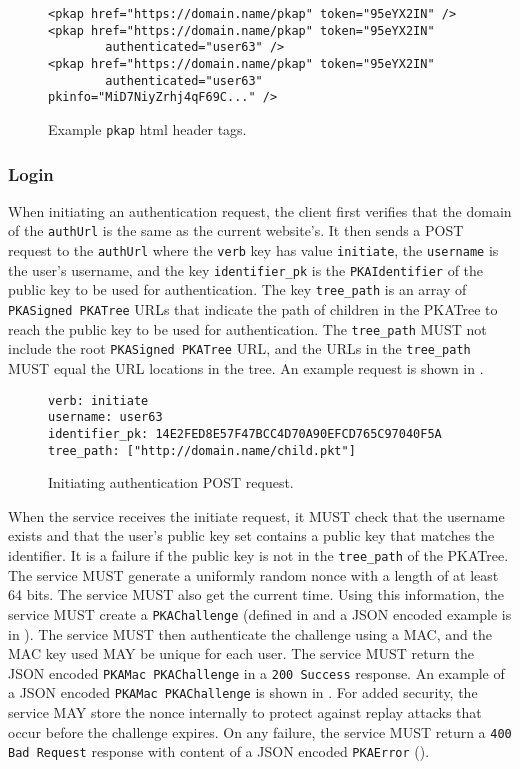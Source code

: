 \documentclass{article}
\begin{document}
\begin{figure}[h!]
\begin{lstlisting}
<pkap href="https://domain.name/pkap" token="95eYX2IN" />
<pkap href="https://domain.name/pkap" token="95eYX2IN" 
        authenticated="user63" />
<pkap href="https://domain.name/pkap" token="95eYX2IN" 
        authenticated="user63" pkinfo="MiD7NiyZrhj4qF69C..." />
\end{lstlisting}
\caption{Example \texttt{pkap} html header tags.}
\label{example:pkaptag}
\end{figure}

\subsubsection{Login}

When initiating an authentication request, the client first verifies that the domain of the \texttt{authUrl} is the same as the current website's. 
It then sends a POST request to the \texttt{authUrl} where the \texttt{verb} key has value \texttt{initiate}, the \texttt{username} is the user's username, and the key \texttt{identifier\_pk} is the \texttt{PKAIdentifier} of the public key to be used for authentication. 
The key \texttt{tree\_path} is an array of \texttt{PKASigned PKATree} URLs that indicate the path of children in the PKATree to reach the public key to be used for authentication. 
The \texttt{tree\_path} MUST not include the root \texttt{PKASigned PKATree} URL, and the URLs in the \texttt{tree\_path} MUST equal the URL locations in the tree. 
An example request is shown in . 


\begin{figure}
\begin{lstlisting}
verb: initiate
username: user63
identifier_pk: 14E2FED8E57F47BCC4D70A90EFCD765C97040F5A
tree_path: ["http://domain.name/child.pkt"]
\end{lstlisting}
\caption{Initiating authentication POST request.}
\label{fig:init_req}
\end{figure}

When the service receives the initiate request, it MUST check that the username exists and that the user's public key set contains a public key that matches the identifier. 
It is a failure if the public key is not in the \texttt{tree\_path} of the PKATree. 
The service MUST generate a uniformly random nonce with a length of at least 64 bits. 
The service MUST also get the current time. 
Using this information, the service MUST create a \texttt{PKAChallenge} (defined in  and a JSON encoded example is in ). 
The service MUST then authenticate the challenge using a MAC, and the MAC key used MAY be unique for each user. 
The service MUST return the JSON encoded \texttt{PKAMac PKAChallenge} in a \texttt{200 Success} response. 
An example of a JSON encoded \texttt{PKAMac PKAChallenge} is shown in . 
For added security, the service MAY store the nonce internally to protect against replay attacks that occur before the challenge expires. 
On any failure, the service MUST return a \texttt{400 Bad Request} response with content of a JSON encoded \texttt{PKAError} (). 
\end{document}
